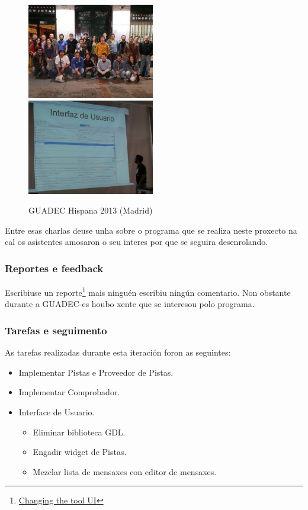 \begin{figure}[h!]
    \centering
    \includegraphics[width=0.495\textwidth]{img/guadec_es_2013_1.jpg}
    \includegraphics[width=0.495\textwidth]{img/guadec_es_2013_2.jpg} 
    \caption{GUADEC Hispana 2013 (Madrid)}
    \label{fig:guadec2012}
\end{figure}

Entre esas charlas deuse unha sobre o programa que se realiza neste proxecto na cal os asistentes amosaron o seu interes por que se seguira desenrolando.

\subsubsection{Reportes e feedback}
Escribiuse un reporte\footnote{\href{http://aquelando.info/changing-the-tool-ui/}{Changing the tool UI}} mais ninguén escribiu ningún comentario. Non obstante durante a GUADEC-es houbo xente que se interesou polo programa.

\subsubsection{Tarefas e seguimento}

As tarefas realizadas durante esta iteración foron as seguintes:

\begin{itemize}
  \item Implementar Pistas e Proveedor de Pistas.
  \item Implementar Comprobador.
  \item Interface de Usuario.
    \begin{itemize}
      \item Eliminar biblioteca GDL.
      \item Engadir widget de Pistas.
      \item Mezclar lista de mensaxes con editor de mensaxes.
    \end{itemize}
\end{itemize}

